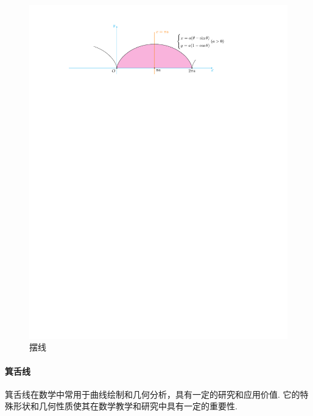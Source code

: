 \begin{figure}[H]
    \centering
    \includegraphics{figures/Cycloid.pdf}
    \caption{摆线}
    \label{cycloid}
\end{figure}

\paragraph{箕舌线}

箕舌线在数学中常用于曲线绘制和几何分析，具有一定的研究和应用价值. 它的特殊形状和几何性质使其在数学教学和研究中具有一定的重要性. 

